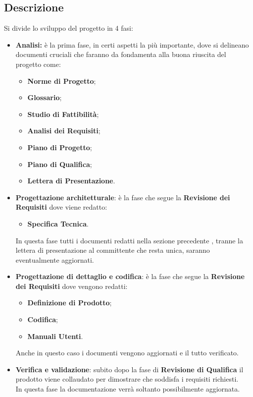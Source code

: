 \documentclass[12pt,a4paper]{article}
\begin{document}
\subsection{Descrizione}

Si divide lo sviluppo del progetto in 4 fasi:
\begin{itemize}
	\item \textbf{Analisi:} è la prima fase, in certi aspetti la più importante, dove si delineano documenti cruciali che faranno da fondamenta alla buona riuscita del progetto come:
	\begin{itemize}
		\item \textbf{Norme di Progetto};
		\item \textbf{Glossario};
		\item \textbf{Studio di Fattibilità};
		\item \textbf{Analisi dei Requisiti};
		\item \textbf{Piano di Progetto};
		\item \textbf{Piano di Qualifica};
		\item \textbf{Lettera di Presentazione}.
	\end{itemize}
	\item \textbf{Progettazione architetturale}: è la fase che segue la \textbf{Revisione dei Requisiti} dove viene redatto:
		\begin{itemize}
		 \item \textbf{Specifica Tecnica}. 
	    \end{itemize} 
	   In questa fase tutti i documenti redatti nella sezione precedente , tranne la lettera di presentazione al committente che resta unica, saranno eventualmente aggiornati.
	\item \textbf{Progettazione di dettaglio e codifica}: è la fase che segue la \textbf{Revisione dei Requisiti} dove vengono redatti:
	\begin{itemize}
		\item \textbf{Definizione di Prodotto};
		\item \textbf{Codifica};
		\item \textbf{Manuali Utenti}.
	\end{itemize}
	Anche in questo caso i documenti vengono aggiornati e il tutto verificato.
	\item \textbf{Verifica e validazione}: subito dopo la fase di \textbf{Revisione di Qualifica} il prodotto viene collaudato per dimostrare che soddisfa i requisiti richiesti.
	\\In questa fase la documentazione verrà soltanto possibilmente aggiornata.
\end{itemize}
\end{document}
